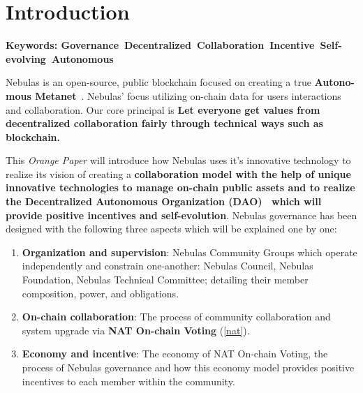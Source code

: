 
\section{Introduction}

\textbf{Keywords: Governance\ Decentralized\ Collaboration\ Incentive\ Self-evolving\ Autonomous }

\vspace{2em}

Nebulas is an open-source, public blockchain focused on creating a true
\textbf{Autono-mous Metanet}~\cite{AutonomousMetanet}. Nebulas' focus utilizing on-chain data for users interactions and collaboration. Our core principal is \textbf{Let everyone get values from decentralized collaboration fairly through technical ways such as blockchain.}~\cite{vision}

This \textit{Orange Paper} will introduce how Nebulas uses it's innovative technology to realize its vision of creating a \textbf{collaboration model with the help of unique innovative technologies to manage on-chain public assets and to realize the Decentralized Autonomous Organization (DAO)~\cite{DAO} which will provide positive incentives and self-evolution}. Nebulas governance has been designed with the following three aspects which will be explained one by one:

\begin{enumerate}
	\item \textbf{Organization and supervision}:
	Nebulas Community Groups which operate independently and constrain one-another: Nebulas Council, Nebulas Foundation, Nebulas Technical Committee; detailing their member composition, power, and obligations.
	\item \textbf{On-chain collaboration}:
	The process of community collaboration and system upgrade via \textbf{NAT On-chain Voting} (\ref{nat}).
	\item \textbf{Economy and incentive}:
	The economy of NAT On-chain Voting, the process of Nebulas governance and how this economy model provides positive incentives to each member within the community.
\end{enumerate}
